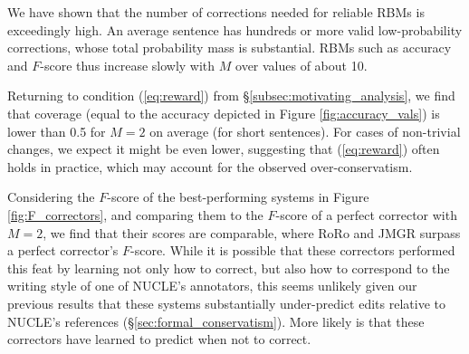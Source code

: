 \documentclass[letterpaper, 11pt]{article}
\begin{document}
We have shown that the number of corrections needed for reliable RBMs is exceedingly high.
An average sentence has hundreds or more valid low-probability corrections, whose total probability mass is substantial. 
RBMs such as accuracy and $F$-score thus increase slowly with $M$ over values of about 10.

%
%
%

Returning to condition (\ref{eq:reward}) from \S\ref{subsec:motivating_analysis}, we find that coverage (equal to the accuracy depicted in Figure \ref{fig:accuracy_vals}) is lower than 0.5 for $M=2$ on average (for short sentences). For cases of non-trivial changes, we expect it might be even lower, suggesting that (\ref{eq:reward}) often holds in practice, which may account for the observed over-conservatism.

Considering the $F$-score of the best-performing systems in Figure \ref{fig:F_correctors}, and comparing them to the $F$-score of a perfect corrector with $M=2$, we find that their scores are comparable, where RoRo and JMGR surpass a perfect corrector's $F$-score.
While it is possible that these correctors performed this feat by learning not only how to correct, but also how to correspond to the writing style of one of NUCLE's annotators, this seems unlikely given our previous results that these systems substantially under-predict edits relative to NUCLE's references (\S\ref{sec:formal_conservatism}). 
More likely is that these correctors have learned to predict when not to correct.
\end{document}
